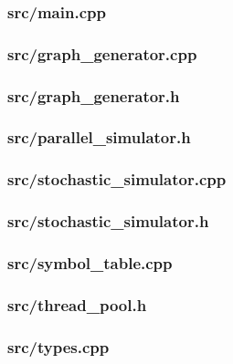 \subsubsection{src/main.cpp}\label{subsection:main}

\newpage
\subsubsection{src/graph\_generator.cpp}\label{subsection:graph_generator}

\newpage
\subsubsection{src/graph\_generator.h}

\newpage
\subsubsection{src/parallel\_simulator.h}

\newpage
\subsubsection{src/stochastic\_simulator.cpp}

\newpage
\subsubsection{src/stochastic\_simulator.h}

\newpage
\subsubsection{src/symbol\_table.cpp}

\newpage
\subsubsection{src/thread\_pool.h}

\newpage
\subsubsection{src/types.cpp}

\newpage
